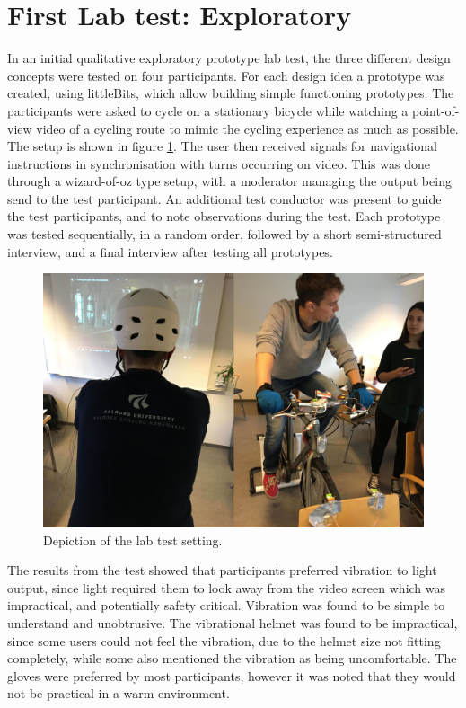 \documentclass{sigchi}
\begin{document}
\section{First Lab test: Exploratory}
In an initial qualitative exploratory prototype lab test, the three different design concepts were tested on four participants. For each design idea a prototype was created, using littleBits, which allow building simple functioning prototypes. The participants were asked to cycle on a stationary bicycle while watching a point-of-view video of a cycling route to mimic the cycling experience as much as possible. The setup is shown in figure \ref{fig:eval1_setup}. The user then received signals for navigational instructions in synchronisation with turns occurring on video. This was done through a wizard-of-oz type setup, with a moderator managing the output being send to the test participant. An additional test conductor was present to guide the test participants, and to note observations during the test. Each prototype was tested sequentially, in a random order, followed by a short semi-structured interview, and a final interview after testing all prototypes.
\begin{figure}[!b]
\centering
\includegraphics[width=0.9\columnwidth]{figures/eval1_setup.jpg}
\caption{Depiction of the lab test setting.}
\label{fig:eval1_setup}
\end{figure}
The results from the test showed that participants preferred vibration to light output, since light required them to look away from the video screen which was impractical, and potentially safety critical. Vibration was found to be simple to understand and unobtrusive. The vibrational helmet was found to be impractical, since some users could not feel the vibration, due to the helmet size not fitting completely, while some also mentioned the vibration as being uncomfortable. The gloves were preferred by most participants, however it was noted that they would not be practical in a warm environment.
\end{document}

